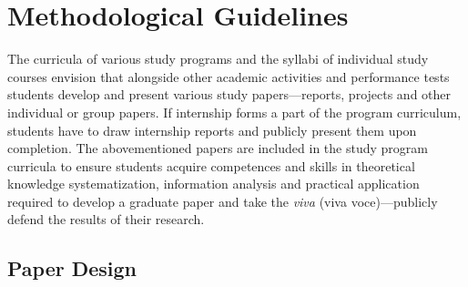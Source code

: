 





\chapter{Methodological Guidelines}

The curricula of various study programs and the syllabi of individual study courses envision that alongside other academic activities and performance tests students develop and present various study papers—reports, projects and other individual or group papers. If internship forms a part of the program curriculum, students have to draw internship reports and publicly present them upon completion. The abovementioned papers are included in the study program curricula to ensure students acquire competences and skills in theoretical knowledge systematization, information analysis and practical application required to develop a graduate paper and take the \emph{viva} (viva voce)—publicly defend the results of their research.

\section{Paper Design}

